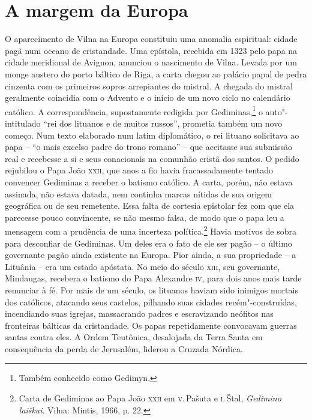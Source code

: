 \chapter{A margem da Europa}

\begin{epigraphs} 
\end{epigraphs}

O aparecimento de Vilna na Europa constituiu uma anomalia espiritual: 
cidade pagã num oceano de cristandade. Uma epístola, recebida em 1323
pelo papa na cidade meridional de Avignon, anunciou o nascimento de
Vilna. Levada por um monge austero do porto báltico de Riga, a carta
chegou ao palácio papal de pedra cinzenta com os primeiros sopros
arrepiantes do mistral. A chegada do mistral geralmente coincidia com o
Advento e o início de um novo ciclo no calendário católico. A
correspondência, supostamente redigida por Gediminas,\footnote{Também conhecido como Gedimyn.} o auto"-intitulado
``rei dos lituanos e de muitos russos'', prometia também um novo começo.
Num texto elaborado num latim diplomático, o rei lituano solicitava ao
papa -- ``o mais excelso padre do trono romano'' -- que aceitasse sua
submissão real e recebesse a si e seus conacionais na comunhão cristã
dos santos. O pedido rejubilou o Papa João \textsc{xxii}, que anos a fio havia
fracassadamente tentado convencer Gediminas a receber o batismo
católico. A carta, porém, não estava assinada, não estava datada, nem
continha marcas nítidas de sua origem geográfica ou de seu remetente.
Essa falta de cortesia epistolar fez com que ela parecesse pouco
convincente, se não mesmo falsa, de modo que o papa leu a mensagem com a
prudência de uma incerteza política.\footnote{Carta de Gediminas ao Papa João \textsc{xxii} em \textsc{v}.\,Pašuta e \textsc{i}.\,Štal, \textit{Gedimino laiškai}. Vilna: Mintis, 1966, p. 22.}
Havia motivos de sobra para desconfiar de Gediminas. Um deles era o fato
de ele ser pagão -- o último governante pagão ainda existente na Europa.
Pior ainda, a sua propriedade -- a Lituânia -- era um estado apóstata. No
meio do século \textsc{xiii}, seu governante, Mindaugas, recebera o batismo do Papa
Alexandre \textsc{iv}, para dois anos mais tarde renunciar à fé. Por mais de um
século, os lituanos haviam sido inimigos mortais dos católicos, atacando
seus castelos, pilhando suas cidades recém"-construídas, incendiando suas
igrejas, massacrando padres e escravizando neófitos nas fronteiras
bálticas da cristandade. Os papas repetidamente convocavam guerras
santas contra eles. A Ordem Teutônica, desalojada da Terra Santa em
consequência da perda de Jerusalém, liderou a Cruzada Nórdica.

